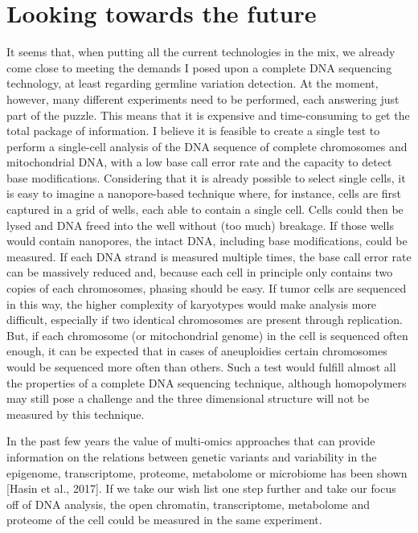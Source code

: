 {\section{Looking towards the future}
It seems that, when putting all the current technologies in the mix, we already come close to meeting the demands I posed upon a complete DNA sequencing technology, at least regarding germline
variation detection. 
At the moment, however, many different experiments need to be performed, each answering just part of the puzzle. 
This means that it is expensive and time-consuming to get the total package of information. 
I believe it is feasible to create a single test to perform a single-cell analysis of the DNA sequence of complete chromosomes and mitochondrial DNA, with a low base call error rate and the capacity to detect base modifications. 
Considering that it is already possible to select single cells, it is easy to imagine a nanopore-based technique where, for instance, cells are first captured in a grid of wells, each able to contain a single cell. 
Cells could then be lysed and DNA freed into the well without (too much) breakage. 
If those wells would contain nanopores, the intact DNA, including base modifications, could be measured. 
If each DNA strand is measured multiple times, the base call error rate can be massively reduced and, because each cell in principle only contains two copies of each chromosomes, phasing should be easy. 
If tumor cells are sequenced in this way, the higher complexity of karyotypes would make analysis more difficult, especially if two identical chromosomes are present through replication. But, if each chromosome (or mitochondrial genome) in the cell is sequenced often enough, it can be expected that in cases of aneuploidies certain chromosomes would be sequenced more often than others. 
Such a test would fulfill almost all the properties of a complete DNA sequencing technique, although homopolymers may still pose a challenge and the three dimensional structure will not be measured by this technique.

In the past few years the value of multi-omics approaches that can provide information on the relations between genetic variants and variability in the epigenome, transcriptome, proteome, metabolome or microbiome has been shown [Hasin et al., 2017]. 
If we take our wish list one step further and take our focus off of DNA analysis, the open chromatin, transcriptome, metabolome and proteome of the cell could be measured in the same experiment. 

}
